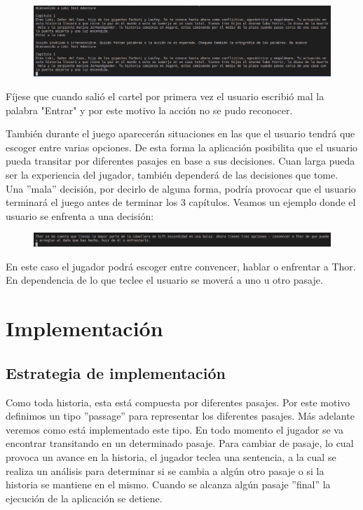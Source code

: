 \documentclass[12pt]{article}
\begin{document}
\begin{figure}[h]
	\begin{center}
		\includegraphics[width =15.0cm]{No_avance.png}
	\end{center}
\end{figure}

F\'ijese que cuando sali\'o el cartel por primera vez el usuario escribi\'o mal la palabra "Entrar" y por este motivo la acci\'on no se pudo reconocer. 

Tambi\'en durante el juego aparecer\'an situaciones en las que el usuario tendr\'a que escoger entre varias opciones. De esta forma la aplicaci\'on posibilita que el usuario pueda transitar por diferentes pasajes en base a sus decisiones. Cuan larga pueda ser la experiencia del jugador, tambi\'en depender\'a de las decisiones que tome. Una ''mala'' decisi\'on, por decirlo de alguna forma, podr\'ia provocar que el usuario terminar\'a el juego antes de terminar los 3 cap\'itulos. Veamos un ejemplo donde el usuario se enfrenta a una decisi\'on: 

\begin{figure}[h]
	\begin{center}
		\includegraphics[width =15.0cm]{Decision.png}
	\end{center}
\end{figure}

En este caso el jugador podr\'a escoger entre convencer, hablar o enfrentar a Thor. En dependencia de lo que teclee el usuario se mover\'a a uno u otro pasaje.

\section{Implementaci\'on}

\subsection{Estrategia de implementaci\'on}

Como toda historia, esta est\'a compuesta por diferentes pasajes. Por este motivo definimos un tipo ''passage'' para representar los diferentes pasajes. M\'as adelante veremos como est\'a implementado este tipo. En todo momento el jugador se va encontrar transitando en un determinado pasaje. Para cambiar de pasaje, lo cual provoca un avance en la historia, el jugador teclea una sentencia, a la cual se realiza un an\'alisis para determinar si se cambia a alg\'un otro pasaje o si la historia se mantiene en el mismo. Cuando se alcanza alg\'un pasaje ''final'' la ejecuci\'on de la aplicaci\'on se detiene.
\end{document}
